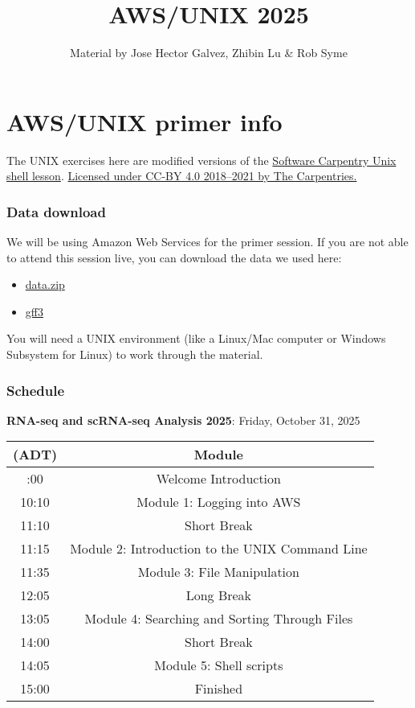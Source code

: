 \documentclass[
]{book}
\title{AWS/UNIX 2025}
\author{Material by Jose Hector Galvez, Zhibin Lu \& Rob Syme}
\date{}
\providecommand{\tightlist}{%
  \setlength{\itemsep}{0pt}\setlength{\parskip}{0pt}}
\begin{document}
\maketitle

{
\setcounter{tocdepth}{1}
\tableofcontents
}
\chapter{AWS/UNIX primer info}\label{awsunix-primer-info}

The UNIX exercises here are modified versions of the \href{https://swcarpentry.github.io/shell-novice/}{Software Carpentry Unix shell lesson}. \href{https://carpentries.org/}{Licensed under CC-BY 4.0 2018--2021 by The Carpentries.}

\subsection{Data download}\label{data-download}

We will be using Amazon Web Services for the primer session. If you are not able to attend this session live, you can download the data we used here:

\begin{itemize}
\tightlist
\item
  \href{https://drive.google.com/file/d/1Rckn6rUl9Tv1XnUcG7MvcAztqhqqCIs-/view?usp=drive_link}{data.zip}
\item
  \href{https://drive.google.com/file/d/1GX4LZlIkXiRQqOZD6Tq30eErSZ3Dgd6n/view?usp=drive_link}{gff3}
\end{itemize}

You will need a UNIX environment (like a Linux/Mac computer or Windows Subsystem for Linux) to work through the material.

\subsection{Schedule}\label{schedule}

\textbf{RNA-seq and scRNA-seq Analysis 2025}: Friday, October 31, 2025

\begin{longtable}[]{@{}cc@{}}
\toprule\noalign{}
(ADT) & Module \\
\midrule\noalign{}
\endhead
\bottomrule\noalign{}
\endlastfoot
10:00 & Welcome Introduction \\
10:10 & Module 1: Logging into AWS \\
11:10 & Short Break \\
11:15 & Module 2: Introduction to the UNIX Command Line \\
11:35 & Module 3: File Manipulation \\
12:05 & Long Break \\
13:05 & Module 4: Searching and Sorting Through Files \\
14:00 & Short Break \\
14:05 & Module 5: Shell scripts \\
15:00 & Finished \\
\end{longtable}
\end{document}
